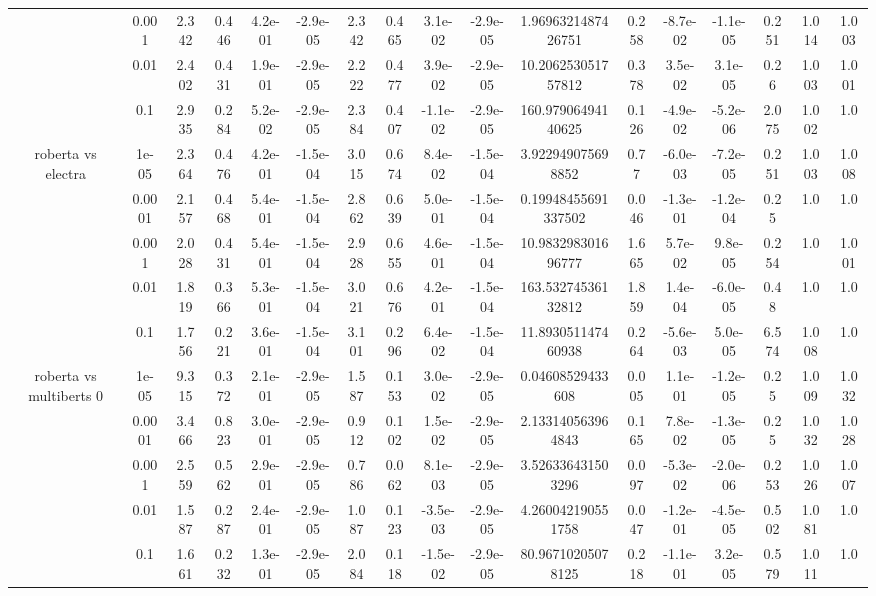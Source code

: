 \begin{tabular}{|c|c|c|c|c|c|c|c|c|c|c|c|c|c|c|c|c|}
 & 0.001 & 2.342 & 0.446 & 4.2e-01 & -2.9e-05 & 2.342 & 0.465 & 3.1e-02 & -2.9e-05 & 1.9696321487426751 & 0.258 & -8.7e-02 & -1.1e-05 & 0.251 & 1.014 & 1.003 \\
 & 0.01 & 2.402 & 0.431 & 1.9e-01 & -2.9e-05 & 2.222 & 0.477 & 3.9e-02 & -2.9e-05 & 10.206253051757812 & 0.378 & 3.5e-02 & 3.1e-05 & 0.26 & 1.003 & 1.001 \\
 & 0.1 & 2.935 & 0.284 & 5.2e-02 & -2.9e-05 & 2.384 & 0.407 & -1.1e-02 & -2.9e-05 & 160.97906494140625 & 0.126 & -4.9e-02 & -5.2e-06 & 2.075 & 1.002 & 1.0 \\
\hline
\multirow{5}{*}{roberta  vs electra } & 1e-05 & 2.364 & 0.476 & 4.2e-01 & -1.5e-04 & 3.015 & 0.674 & 8.4e-02 & -1.5e-04 & 3.922949075698852 & 0.77 & -6.0e-03 & -7.2e-05 & 0.251 & 1.003 & 1.008 \\
 & 0.0001 & 2.157 & 0.468 & 5.4e-01 & -1.5e-04 & 2.862 & 0.639 & 5.0e-01 & -1.5e-04 & 0.19948455691337502 & 0.046 & -1.3e-01 & -1.2e-04 & 0.25 & 1.0 & 1.0 \\
 & 0.001 & 2.028 & 0.431 & 5.4e-01 & -1.5e-04 & 2.928 & 0.655 & 4.6e-01 & -1.5e-04 & 10.983298301696777 & 1.665 & 5.7e-02 & 9.8e-05 & 0.254 & 1.0 & 1.001 \\
 & 0.01 & 1.819 & 0.366 & 5.3e-01 & -1.5e-04 & 3.021 & 0.676 & 4.2e-01 & -1.5e-04 & 163.53274536132812 & 1.859 & 1.4e-04 & -6.0e-05 & 0.48 & 1.0 & 1.0 \\
 & 0.1 & 1.756 & 0.221 & 3.6e-01 & -1.5e-04 & 3.101 & 0.296 & 6.4e-02 & -1.5e-04 & 11.893051147460938 & 0.264 & -5.6e-03 & 5.0e-05 & 6.574 & 1.008 & 1.0 \\
\hline
\multirow{5}{*}{roberta  vs multiberts 0} & 1e-05 & 9.315 & 0.372 & 2.1e-01 & -2.9e-05 & 1.587 & 0.153 & 3.0e-02 & -2.9e-05 & 0.04608529433608 & 0.005 & 1.1e-01 & -1.2e-05 & 0.25 & 1.009 & 1.032 \\
 & 0.0001 & 3.466 & 0.823 & 3.0e-01 & -2.9e-05 & 0.912 & 0.102 & 1.5e-02 & -2.9e-05 & 2.133140563964843 & 0.165 & 7.8e-02 & -1.3e-05 & 0.25 & 1.032 & 1.028 \\
 & 0.001 & 2.559 & 0.562 & 2.9e-01 & -2.9e-05 & 0.786 & 0.062 & 8.1e-03 & -2.9e-05 & 3.526336431503296 & 0.097 & -5.3e-02 & -2.0e-06 & 0.253 & 1.026 & 1.007 \\
 & 0.01 & 1.587 & 0.287 & 2.4e-01 & -2.9e-05 & 1.087 & 0.123 & -3.5e-03 & -2.9e-05 & 4.260042190551758 & 0.047 & -1.2e-01 & -4.5e-05 & 0.502 & 1.081 & 1.0 \\
 & 0.1 & 1.661 & 0.232 & 1.3e-01 & -2.9e-05 & 2.084 & 0.118 & -1.5e-02 & -2.9e-05 & 80.96710205078125 & 0.218 & -1.1e-01 & 3.2e-05 & 0.579 & 1.011 & 1.0 \\

\end{tabular}
